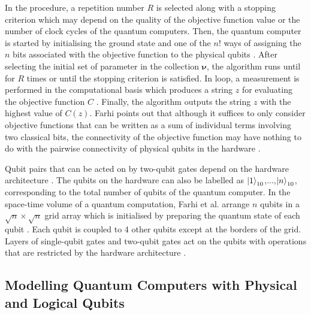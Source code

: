 In the procedure, a repetition number $R$ is selected along with a stopping criterion which may depend on the quality of the objective function value or the number of clock cycles of the quantum computers. Then, the quantum computer is started by initialising the ground state and one of the $n!$ ways of assigning the $n$ bits associated with the objective function to the physical qubits \cite{farhi2017quantum}. After selecting the initial set of parameter in the collection $\mathbf{\nu}$, the algorithm runs until for $R$ times or until the stopping criterion is satisfied. In loop, a measurement is performed in the computational basis which produces a string $z$ for evaluating the objective function $C$ \cite{farhi2017quantum}. Finally, the algorithm outputs the string $z$ with the highest value of $C(z)$. Farhi points out that although it suffices to only consider objective functions that can be written as a sum of individual terms involving two classical bits, the connectivity of the objective function may have nothing to do with the pairwise connectivity of physical qubits in the hardware \cite{farhi2017quantum}. 

Qubit pairs that can be acted on by two-qubit gates depend on the hardware architecture \cite{farhi2017quantum}. The qubits on the hardware can also be labelled as $\ket{1}_{10}$,...,$\ket{n}_{10}$, corresponding to the total number of qubits of the quantum computer. In the space-time volume of a quantum computation, Farhi et al. arrange $n$ qubits in a $\sqrt{n}\times \sqrt{n}$ grid array which is initialised by preparing the quantum state of each qubit \cite{farhi2017quantum}. Each qubit is coupled to 4 other qubits except at the borders of the grid. Layers of single-qubit gates and two-qubit gates act on the qubits with operations that are restricted by the hardware architecture \cite{farhi2017quantum}. 

\subsection{Modelling Quantum Computers with Physical and Logical Qubits}

